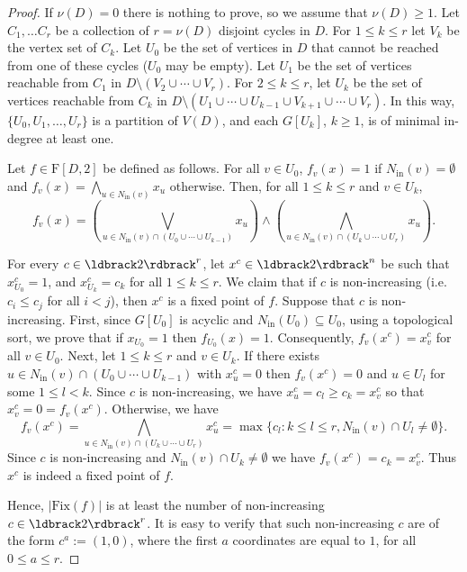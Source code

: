 \documentclass[a4paper, 11pt]{book}
\numberwithin{equation}{section}
\theoremstyle{plain}
\newcommand{\neighbourhood}{N}
\newcommand{\inn}[1]{#1_\mathrm{in}}
\newcommand{\NIn}{\inn{\neighbourhood}}
\newcommand{\functions}{\mathrm{F}}
\newcommand{\Fix}{\mathrm{Fix}}
\renewcommand{\(}{\ldbrack}
\renewcommand{\)}{\rdbrack}
\begin{document}
\begin{proof}
If $\nu(D)=0$ there is nothing to prove, so we assume that $\nu(D)\geq 1$. Let $C_1,\dots C_r$ be a collection of $r=\nu(D)$ disjoint cycles in $D$. For $1\leq k\leq r$ let $V_k$ be the vertex set of $C_k$. Let $U_0$ be the set of vertices in $D$ that cannot be reached from one of these cycles ($U_0$ may be empty). Let $U_1$ be the set of vertices reachable from $C_1$ in $D\setminus (V_2\cup\cdots\cup  V_r)$. For $2\leq k\leq r$, let $U_k$ be the set of vertices reachable from $C_k$ in $D\setminus (U_1\cup\cdots\cup U_{k-1}\cup V_{k+1}\cup\cdots\cup  V_r)$. In this way, $\{U_0,U_1,\dots,U_r\}$ is a partition of $V(D)$, and each $G[U_k]$, $k\geq 1$, is of minimal in-degree at least one. 

Let $f\in\functions[D,2]$ be defined as follows. For all $v\in U_0$, $f_v(x)=1$ if $\NIn(v)=\emptyset$ and $f_v(x)= \bigwedge_{u\in\NIn(v)} x_u$ otherwise. Then, for all $1\leq k\leq r$ and 
$v\in U_k$,
\[
f_v(x)=
\left(\bigvee_{u\in\NIn(v)\cap (U_0\cup\cdots\cup U_{k-1})} x_u \right) \land
\left( \bigwedge_{u\in\NIn(v)\cap (U_k\cup\cdots\cup U_r)} x_u\right).
\] 

For every $c\in \(2\)^r$, let $x^c\in \(2\)^n$ be such that $x^c_{U_0} = 1$, and $x^c_{U_k}=c_k$  for all  $1\leq k\leq r$. We claim that if $c$ is non-increasing (i.e. $c_i \le c_j$ for all $i < j$), then $x^c$ is a fixed point of $f$. Suppose that $c$ is non-increasing. First, since $G[U_0]$ is acyclic and $\NIn(U_0)\subseteq U_0$, using a topological sort, we prove that if $x_{U_0} = 1$ then $f_{U_0}(x) = 1$. Consequently, $f_v(x^c)=x^c_v$ for all $v\in U_0$. Next, let $1\leq k\leq r$ and $v\in U_k$. If there exists $u\in\NIn(v)\cap (U_0\cup\cdots\cup U_{k-1})$ with $x^c_u=0$ then $f_v(x^c)=0$ and $u\in U_l$ for some $1\leq l<k$. Since $c$ is non-increasing, we have $x^c_u=c_l\geq c_k=x^c_v$ so that $x^c_v=0=f_v(x^c)$. Otherwise, we have  
\[
	f_v(x^c) = \bigwedge_{u\in\NIn(v)\cap (U_k\cup\cdots\cup U_r)} x^c_u =\max\{c_l:  k\leq l\leq r,\NIn(v)\cap U_l\neq\emptyset\}. 
\]
Since $c$ is non-increasing and $\NIn(v)\cap U_k\neq\emptyset$ we have $f_v(x^c)=c_k=x^c_v$. Thus $x^c$ is indeed a fixed point of $f$. 

Hence, $|\Fix(f)|$ is at least the number of non-increasing $c\in \(2\)^r$. It is easy to verify that such non-increasing $c$ are of the form $c^a := (1,0)$, where the first $a$ coordinates are equal to $1$, for all $0 \le a \le r$. 
\end{proof}
\end{document}
